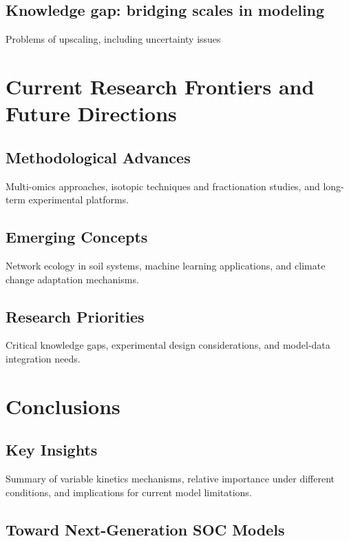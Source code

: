 \documentclass[12pt,a4paper]{article}
\begin{document}
\subsection{Knowledge gap: bridging scales in modeling} \label{sec:synthesis_scales}

Problems of upscaling, including uncertainty issues


\section{Current Research Frontiers and Future Directions} \label{sec:future}

\subsection{Methodological Advances} \label{sec:future_methods}

Multi-omics approaches, isotopic techniques and fractionation studies, and long-term experimental platforms.

\subsection{Emerging Concepts} \label{sec:future_concepts}

Network ecology in soil systems, machine learning applications, and climate change adaptation mechanisms.

\subsection{Research Priorities} \label{sec:future_priorities}

Critical knowledge gaps, experimental design considerations, and model-data integration needs.


\section{Conclusions} \label{sec:conclusions}

\subsection{Key Insights} \label{sec:conclusions_insights}

Summary of variable kinetics mechanisms, relative importance under different conditions, and implications for current model limitations.

\subsection{Toward Next-Generation SOC Models} \label{sec:conclusions_models}
\end{document}
